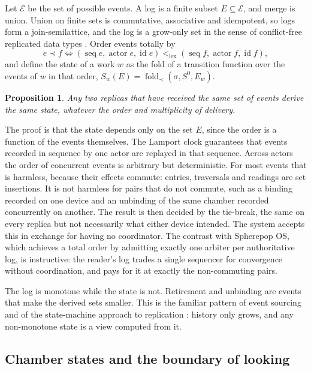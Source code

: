 \documentclass[11pt]{article}
\newtheorem{proposition}{Proposition}
\theoremstyle{remark}
\begin{document}
Let $\mathcal{E}$ be the set of possible events. A log is a finite subset $E \subseteq \mathcal{E}$, and merge is union. Union on finite sets is commutative, associative and idempotent, so logs form a join-semilattice, and the log is a grow-only set in the sense of conflict-free replicated data types \cite{shapiro2011}. Order events totally by
\[
e \prec f \iff (\operatorname{seq} e, \operatorname{actor} e, \operatorname{id} e) <_{\mathrm{lex}} (\operatorname{seq} f, \operatorname{actor} f, \operatorname{id} f),
\]
and define the state of a work $w$ as the fold of a transition function over the events of $w$ in that order, $S_w(E) = \operatorname{fold}_\prec(\sigma, S^0, E_w)$.

\begin{proposition}
\label{prop:convergence}
Any two replicas that have received the same set of events derive the same state, whatever the order and multiplicity of delivery.
\end{proposition}

The proof is that the state depends only on the set $E$, since the order is a function of the events themselves. The Lamport clock guarantees that events recorded in sequence by one actor are replayed in that sequence. Across actors the order of concurrent events is arbitrary but deterministic. For most events that is harmless, because their effects commute: entries, traversals and readings are set insertions. It is not harmless for pairs that do not commute, such as a binding recorded on one device and an unbinding of the same chamber recorded concurrently on another. The result is then decided by the tie-break, the same on every replica but not necessarily what either device intended. The system accepts this in exchange for having no coordinator. The contrast with Spherepop OS, which achieves a total order by admitting exactly one arbiter per authoritative log, is instructive: the reader's log trades a single sequencer for convergence without coordination, and pays for it at exactly the non-commuting pairs.

The log is monotone while the state is not. Retirement and unbinding are events that make the derived sets smaller. This is the familiar pattern of event sourcing and of the state-machine approach to replication \cite{schneider1990}: history only grows, and any non-monotone state is a view computed from it.

\subsection{Chamber states and the boundary of looking}
\end{document}
